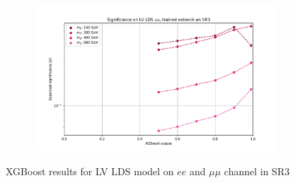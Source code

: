\documentclass[12pt, a4paper]{book}
\begin{document}
\begin{figure}[!ht]
\begin{subfigure}[b]{0.49\textwidth}
   \end{subfigure}
   \hfill
   \begin{subfigure}[b]{0.49\textwidth}
      \centering
      \includegraphics[width=1\textwidth]{XGBoost/Model_independent/150/LV_LDS/EXP_SIG_uu.pdf}
   \end{subfigure}
   \caption{XGBoost results for LV LDS model on $ee$ and $\mu\mu$ channel in SR3}\label{fig:LV_LDS_SR3}
\end{figure}
\end{document}
